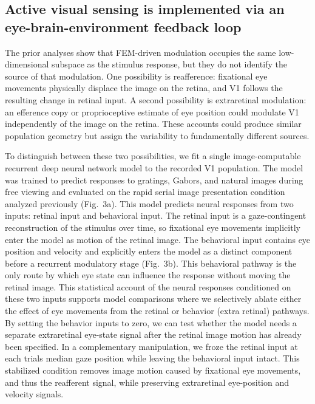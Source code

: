 \documentclass{lite}
\begin{document}
\subsection{Active visual sensing is implemented via an eye-brain-environment feedback loop}

The prior analyses show that FEM-driven modulation occupies the same low-dimensional subspace as the stimulus response, but they do not identify the source of that modulation. One possibility is reafference: fixational eye movements physically displace the image on the retina, and V1 follows the resulting change in retinal input. A second possibility is extraretinal modulation: an efference copy or proprioceptive estimate of eye position could modulate V1 independently of the image on the retina. These accounts could produce similar population geometry but assign the variability to fundamentally different sources.

To distinguish between these two possibilities, we fit a single image-computable recurrent deep neural network model to the recorded V1 population. The model was trained to predict responses to gratings, Gabors, and natural images during free viewing \cite{yates2023detailed} and evaluated on the rapid serial image presentation condition analyzed previously (Fig.~3a). This model predicts neural responses from two inputs: retinal input and behavioral input. The retinal input is a gaze-contingent reconstruction of the stimulus over time, so fixational eye movements implicitly enter the model as motion of the retinal image. The behavioral input contains eye position and velocity and explicitly enters the model as a distinct component before a recurrent modulatory stage (Fig.~3b). This behavioral pathway is the only route by which eye state can influence the response without moving the retinal image. This statistical account of the neural responses conditioned on these two inputs supports model comparisons where we selectively ablate either the effect of eye movements from the retinal or behavior (extra retinal) pathways. By setting the behavior inputs to zero, we can test whether the model needs a separate extraretinal eye-state signal after the retinal image motion has already been specified. In a complementary manipulation, we froze the retinal input at each trials median gaze position while leaving the behavioral input intact. This stabilized condition removes image motion caused by fixational eye movements, and thus the reafferent signal, while preserving extraretinal eye-position and velocity signals.
\end{document}
